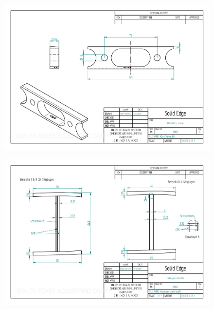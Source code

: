 \begin{figure}[h]
	\includegraphics[angle=90, scale=0.75]{PDFs/KlotzVorne.pdf}
	\centering
\end{figure}
\begin{figure}[h]
	\includegraphics[angle=90, scale=0.75]{PDFs/Holmquerschnitte.pdf}
	\centering
\end{figure}

